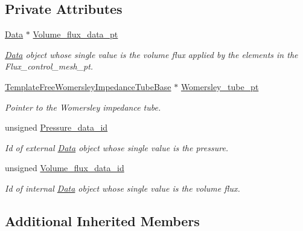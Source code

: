\subsection*{Private Attributes}
\begin{DoxyCompactItemize}
\item 
\hyperlink{classoomph_1_1Data}{Data} $\ast$ \hyperlink{classoomph_1_1NavierStokesWomersleyPressureControlElement_ab7385fe09993adfda19e4787f91abeb6}{Volume\+\_\+flux\+\_\+data\+\_\+pt}
\begin{DoxyCompactList}\small\item\em \hyperlink{classoomph_1_1Data}{Data} object whose single value is the volume flux applied by the elements in the Flux\+\_\+control\+\_\+mesh\+\_\+pt. \end{DoxyCompactList}\item 
\hyperlink{classoomph_1_1TemplateFreeWomersleyImpedanceTubeBase}{Template\+Free\+Womersley\+Impedance\+Tube\+Base} $\ast$ \hyperlink{classoomph_1_1NavierStokesWomersleyPressureControlElement_a8aedb28c49fd569eb65687efd2139abc}{Womersley\+\_\+tube\+\_\+pt}
\begin{DoxyCompactList}\small\item\em Pointer to the Womersley impedance tube. \end{DoxyCompactList}\item 
unsigned \hyperlink{classoomph_1_1NavierStokesWomersleyPressureControlElement_acf1843645f77e2616aa851e902713c91}{Pressure\+\_\+data\+\_\+id}
\begin{DoxyCompactList}\small\item\em Id of external \hyperlink{classoomph_1_1Data}{Data} object whose single value is the pressure. \end{DoxyCompactList}\item 
unsigned \hyperlink{classoomph_1_1NavierStokesWomersleyPressureControlElement_a90810e440b763afca53dc50b24a7848c}{Volume\+\_\+flux\+\_\+data\+\_\+id}
\begin{DoxyCompactList}\small\item\em Id of internal \hyperlink{classoomph_1_1Data}{Data} object whose single value is the volume flux. \end{DoxyCompactList}\end{DoxyCompactItemize}
\subsection*{Additional Inherited Members}


